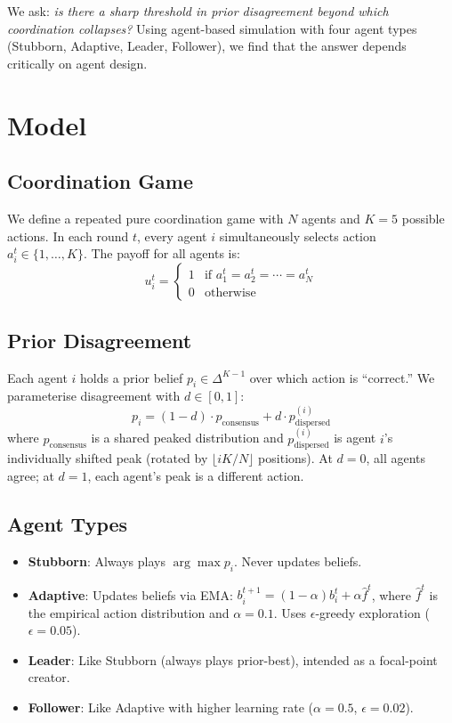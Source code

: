 \documentclass[11pt]{article}
\begin{document}
We ask: \emph{is there a sharp threshold in prior disagreement beyond which coordination collapses?}
Using agent-based simulation with four agent types (Stubborn, Adaptive, Leader, Follower), we find that the answer depends critically on agent design.

\section{Model}

\subsection{Coordination Game}
We define a repeated pure coordination game with $N$ agents and $K = 5$ possible actions.
In each round $t$, every agent $i$ simultaneously selects action $a_i^t \in \{1, \ldots, K\}$.
The payoff for all agents is:
\begin{equation}
  u_i^t = \begin{cases} 1 & \text{if } a_1^t = a_2^t = \cdots = a_N^t \\ 0 & \text{otherwise} \end{cases}
\end{equation}

\subsection{Prior Disagreement}
Each agent $i$ holds a prior belief $p_i \in \Delta^{K-1}$ over which action is ``correct.''
We parameterise disagreement with $d \in [0, 1]$:
\begin{equation}
  p_i = (1 - d) \cdot p_{\text{consensus}} + d \cdot p_{\text{dispersed}}^{(i)}
\end{equation}
where $p_{\text{consensus}}$ is a shared peaked distribution and $p_{\text{dispersed}}^{(i)}$ is agent $i$'s individually shifted peak (rotated by $\lfloor iK/N \rfloor$ positions).
At $d = 0$, all agents agree; at $d = 1$, each agent's peak is a different action.

\subsection{Agent Types}
\begin{itemize}
  \item \textbf{Stubborn}: Always plays $\arg\max p_i$. Never updates beliefs.
  \item \textbf{Adaptive}: Updates beliefs via EMA: $b_i^{t+1} = (1 - \alpha) b_i^t + \alpha \hat{f}^t$, where $\hat{f}^t$ is the empirical action distribution and $\alpha = 0.1$. Uses $\epsilon$-greedy exploration ($\epsilon = 0.05$).
  \item \textbf{Leader}: Like Stubborn (always plays prior-best), intended as a focal-point creator.
  \item \textbf{Follower}: Like Adaptive with higher learning rate ($\alpha = 0.5$, $\epsilon = 0.02$).
\end{itemize}
\end{document}
